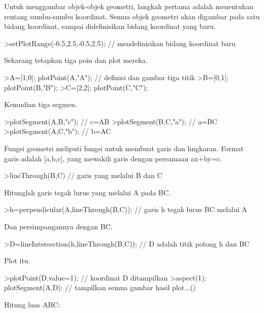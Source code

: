 \documentclass[a4paper,10pt]{article}
\begin{document}
\begin{eulernotebook}
\begin{eulercomment}
\begin{eulercomment}
\begin{eulercomment}
\end{eulercomment}
\begin{eulercomment}
Untuk menggambar objek-objek geometri, langkah pertama adalah menentukan rentang sumbu-sumbu
koordinat. Semua objek geometri akan digambar pada satu bidang koordinat, sampai
didefinisikan bidang koordinat yang baru.
\end{eulercomment}
\begin{eulerprompt}
>setPlotRange(-0.5,2.5,-0.5,2.5); // mendefinisikan bidang koordinat baru 
\end{eulerprompt}
\begin{eulercomment}
Sekarang tetapkan tiga poin dan plot mereka.
\end{eulercomment}
\begin{eulerprompt}
>A=[1,0]; plotPoint(A,"A"); // definisi dan gambar tiga titik
>B=[0,1]; plotPoint(B,"B");
>C=[2,2]; plotPoint(C,"C");
\end{eulerprompt}
\begin{eulercomment}
Kemudian tiga segmen.
\end{eulercomment}
\begin{eulerprompt}
>plotSegment(A,B,"c"); // c=AB
>plotSegment(B,C,"a"); // a=BC
>plotSegment(A,C,"b"); // b=AC
\end{eulerprompt}
\begin{eulercomment}
Fungsi geometri meliputi fungsi untuk membuat garis dan lingkaran.
Format garis adalah [a,b,c], yang mewakili garis dengan persamaan
ax+by=c.
\end{eulercomment}
\begin{eulerprompt}
>lineThrough(B,C) // garis yang melalui B dan C
\end{eulerprompt}
\begin{euleroutput}
  [-1,  2,  2]
\end{euleroutput}
\begin{eulercomment}
Hitunglah garis tegak lurus yang melalui A pada BC.
\end{eulercomment}
\begin{eulerprompt}
>h=perpendicular(A,lineThrough(B,C)); // garis h tegak lurus BC melalui A
\end{eulerprompt}
\begin{eulercomment}
Dan persimpangannya dengan BC.
\end{eulercomment}
\begin{eulerprompt}
>D=lineIntersection(h,lineThrough(B,C)); // D adalah titik potong h dan BC
\end{eulerprompt}
\begin{eulercomment}
Plot itu.
\end{eulercomment}
\begin{eulerprompt}
>plotPoint(D,value=1); // koordinat D ditampilkan
>aspect(1); plotSegment(A,D): // tampilkan semua gambar hasil plot...()
\end{eulerprompt}
\begin{eulercomment}
Hitung luas ABC:


\end{eulercomment}
\end{eulercomment}
\end{eulercomment}
\end{eulernotebook}
\end{document}

